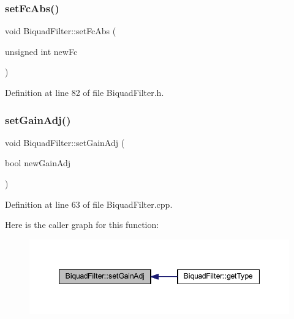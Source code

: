 \subsubsection{\texorpdfstring{set\+Fc\+Abs()}{setFcAbs()}}
{\footnotesize\ttfamily void Biquad\+Filter\+::set\+Fc\+Abs (\begin{DoxyParamCaption}\item[{unsigned int}]{new\+Fc }\end{DoxyParamCaption})\hspace{0.3cm}{\ttfamily [inline]}}



Definition at line 82 of file Biquad\+Filter.\+h.

\mbox{\label{class_biquad_filter_a8d742032c260e7b5fefddf2cde94facb}} 
\subsubsection{\texorpdfstring{set\+Gain\+Adj()}{setGainAdj()}}
{\footnotesize\ttfamily void Biquad\+Filter\+::set\+Gain\+Adj (\begin{DoxyParamCaption}\item[{bool}]{new\+Gain\+Adj }\end{DoxyParamCaption})}



Definition at line 63 of file Biquad\+Filter.\+cpp.

Here is the caller graph for this function\+:
\nopagebreak
\begin{figure}[H]
\begin{center}
\leavevmode
\includegraphics[width=347pt]{class_biquad_filter_a8d742032c260e7b5fefddf2cde94facb_icgraph}
\end{center}
\end{figure}
\mbox{\label{class_biquad_filter_a57c5069dadf75d44783a2fb20dadfbc4}} 
